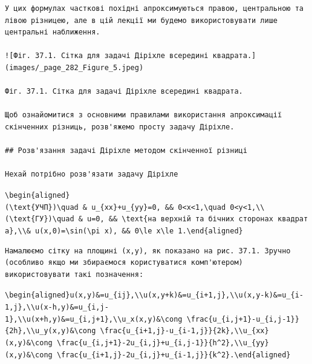 \documentclass[
  ukrainian,
]{article}
\begin{document}
\begin{verbatim}
У цих формулах часткові похідні апроксимуються правою, центральною та лівою різницею, але в цій лекції ми будемо використовувати лише центральні наближення.

![Фіг. 37.1. Сітка для задачі Діріхле всередині квадрата.](images/_page_282_Figure_5.jpeg)

Фіг. 37.1. Сітка для задачі Діріхле всередині квадрата.

Щоб ознайомитися з основними правилами використання апроксимації скінченних різниць, розв'яжемо просту задачу Діріхле.

## Розв'язання задачі Діріхле методом скінченної різниці

Нехай потрібно розв'язати задачу Діріхле
\end{verbatim}

\texttt{\textbackslash{}begin\{aligned\}(\textbackslash{}text\{УЧП\})\textbackslash{}quad\ \&\ u\_\{xx\}+u\_\{yy\}=0,\ \&\&\ 0\textless{}x\textless{}1,\textbackslash{}quad\ 0\textless{}y\textless{}1,\textbackslash{}\textbackslash{}(\textbackslash{}text\{ГУ\})\textbackslash{}quad\ \&\ u=0,\ \&\&\ \textbackslash{}text\{на\ верхній\ та\ бічних\ сторонах\ квадрата\},\textbackslash{}\textbackslash{}\&\ u(x,0)=\textbackslash{}sin(\textbackslash{}pi\ x),\ \&\&\ 0\textbackslash{}le\ x\textbackslash{}le\ 1.\textbackslash{}end\{aligned\}}

\begin{verbatim}
Намалюємо сітку на площині (x,y), як показано на рис. 37.1. Зручно (особливо якщо ми збираємося користуватися комп'ютером) використовувати такі позначення:
\end{verbatim}

\texttt{\textbackslash{}begin\{aligned\}u(x,y)\&=u\_\{ij\},\textbackslash{}\textbackslash{}u(x,y+k)\&=u\_\{i+1,j\},\textbackslash{}\textbackslash{}u(x,y-k)\&=u\_\{i-1,j\},\textbackslash{}\textbackslash{}u(x-h,y)\&=u\_\{i,j-1\},\textbackslash{}\textbackslash{}u(x+h,y)\&=u\_\{i,j+1\},\textbackslash{}\textbackslash{}u\_x(x,y)\&\textbackslash{}cong\ \textbackslash{}frac\{u\_\{i,j+1\}-u\_\{i,j-1\}\}\{2h\},\textbackslash{}\textbackslash{}u\_y(x,y)\&\textbackslash{}cong\ \textbackslash{}frac\{u\_\{i+1,j\}-u\_\{i-1,j\}\}\{2k\},\textbackslash{}\textbackslash{}u\_\{xx\}(x,y)\&\textbackslash{}cong\ \textbackslash{}frac\{u\_\{i,j+1\}-2u\_\{i,j\}+u\_\{i,j-1\}\}\{h\^{}2\},\textbackslash{}\textbackslash{}u\_\{yy\}(x,y)\&\textbackslash{}cong\ \textbackslash{}frac\{u\_\{i+1,j\}-2u\_\{i,j\}+u\_\{i-1,j\}\}\{k\^{}2\}.\textbackslash{}end\{aligned\}}
\end{document}
